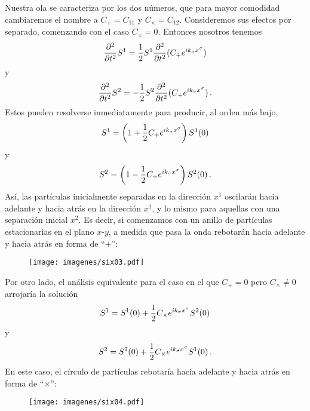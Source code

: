 \documentclass[11pt,b5paper,openany,twoside]{book}
\begin{document}
Nuestra ola se caracteriza por los dos números, que para mayor comodidad cambiaremos el nombre a $C_+ = C_{11}$ y $C_\times = C_{12}$.
Consideremos sus efectos por separado, comenzando con el caso $C_\times=0$.
Entonces nosotros tenemos
\begin{equation}
{{\partial^2}\over{\partial t^2}}S^1 = {1\over 2} S^1
{{\partial^2}\over{\partial t^2}}
(C_+ e^{ik_\sigma x^\sigma})\label{6.63}
\end{equation}
y
\begin{equation}
{{\partial^2}\over{\partial t^2}}S^2 = -{1\over 2} S^2
{{\partial^2}\over{\partial t^2}}
(C_+ e^{ik_\sigma x^\sigma})\,.\label{6.64}
\end{equation}
Estos pueden resolverse inmediatamente para producir, al orden más bajo,
\begin{equation}
S^1 = \left(1+{1\over 2}C_+ e^{ik_\sigma x^\sigma}
\right)S^1(0)\label{6.65}
\end{equation}
y
\begin{equation}
S^2 = \left(1-{1\over 2}C_+ e^{ik_\sigma x^\sigma}
\right)S^2(0)\,.\label{6.66}
\end{equation}
Así, las partículas inicialmente separadas en la dirección $x^1$ oscilarán hacia adelante y hacia atrás en la dirección $x^1$, y lo mismo para aquellas con una separación inicial $x^2$.
Es decir, si comenzamos con un anillo de partículas estacionarias en el plano $x$-$y$, a medida que pasa la onda rebotarán hacia adelante y hacia atrás en forma de ``$+$'':

\begin{figure}[h]
\centering
\texttt{[image: imagenes/six03.pdf]}
\end{figure}

\noindent
Por otro lado, el análisis equivalente para el caso en el que $C_+=0$ pero $C_\times\neq 0$ arrojaría la solución
\begin{equation}
S^1 = S^1(0)+{1\over 2}C_\times e^{ik_\sigma x^\sigma}
S^2(0)\label{6.67}
\end{equation}
y
\begin{equation}
S^2 = S^2(0)+{1\over 2}C_\times e^{ik_\sigma x^\sigma}
S^1(0)\,.\label{6.68}
\end{equation}
En este caso, el círculo de partículas rebotaría hacia adelante y hacia atrás en forma de ``$\times$'':

\begin{figure}[h]
\centering
\texttt{[image: imagenes/six04.pdf]}
\end{figure}
\end{document}
